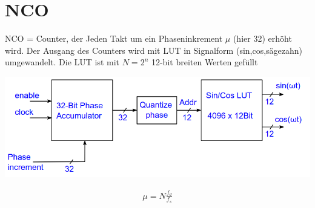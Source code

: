 \documentclass[10pt,a4paper]{article}
\begin{document}
\section{NCO}
NCO = Counter, der Jeden Takt um ein Phaseninkrement $\mu$ (hier 32) erhöht wird.
Der Ausgang des Counters wird mit LUT in Signalform (sin,cos,sägezahn) umgewandelt. 
Die LUT ist mit $N = 2^n$ 12-bit breiten Werten gefüllt 
  \begin{center}
      \includegraphics[width=.35\textwidth]{./img/nco.png}
  \end{center}
  \begin{mdframed}[style=exercise]
    \begin{align}
        \mu = N \frac{f_d}{f_s}  
    \end{align}
  \end{mdframed}
\end{document}
